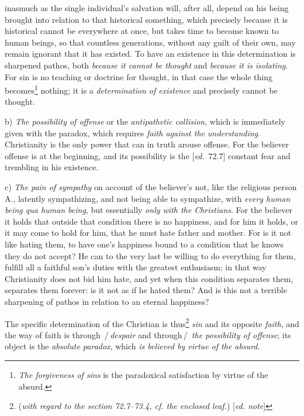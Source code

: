 \documentclass[12pt,a4paper,openany]{book}
\newcommand{\kpage}[1]{\marginnote{\footnotesize\textit{[#1]}}}
\newcommand{\ed}[1]{{\small[\textit{ed.}\ #1]}}
\newcommand{\ednote}[1]{{\small[\textit{ed. note}]}}
\newcommand{\ins}[1]{\,/\,#1\,/\,}
\begin{document}
inasmuch as the single individual's salvation will, after all, depend on his being brought into
relation to that historical something, which precisely because it is historical cannot
be everywhere at once, but takes time to become known to human beings,
so that countless generations, without any guilt of their own, may remain
ignorant that it has existed. To have an existence in this
determination is sharpened pathos, both \emph{because it cannot be thought} and
\emph{because it is isolating}. For sin is no teaching or doctrine for
thought, in that case the whole thing becomes\footnote[80]{\emph{The forgiveness of sins} is the paradoxical satisfaction by virtue of the absurd.}
nothing; it is a \emph{determination of existence}
and precisely cannot be thought.

b) \emph{The possibility of offense} or the \emph{antipathetic collision}, which is immediately
given with the paradox, which requires \emph{faith against the understanding}. Christianity
is the only power that can in truth arouse offense.
For the believer offense is at the beginning, and its
possibility is the \ed{72.7} constant fear and trembling in his existence.

\kpage{151}c) \emph{The pain of sympathy} on account of the believer's not, like the
religious person A., latently sympathizing, and not being able to sympathize, with \emph{every
human being qua human being}, but essentially \emph{only with the Christians}. For
the believer it holds that outside that condition there is no
happiness, and for him it holds, or it may come to hold for
him, that he must hate father and mother. For is it not like
hating them, to have one's happiness bound to a condition that he knows they
do not accept? He can to the very last be willing to do everything for them, fulfill
all a faithful son's duties with the greatest enthusiasm; in that way
Christianity does not bid him hate, and yet when this condition separates
them, separates them forever: is it not as if he hated
them? And is this not a terrible sharpening of pathos in relation
to an eternal happiness?

The specific determination of the Christian is thus\footnote[81]{(\emph{with regard to the section 72.7--73.4, cf. the enclosed leaf.})
\ednote{}}
\emph{sin} and
its opposite \emph{faith}, and the way of faith is through \ins{\emph{despair} and
through} \emph{the possibility of offense}; its object is the \emph{absolute paradox},
which \emph{is believed by virtue of the absurd}.
\end{document}
